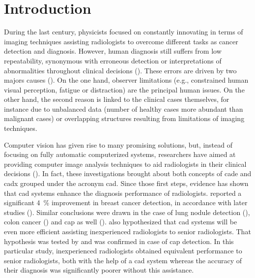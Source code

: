 \section{Introduction} \label{sec:introduction}

During the last century, physicists focused on constantly innovating in terms of imaging techniques assisting radiologists to overcome different tasks as cancer detection and diagnosis. However, human diagnosis still suffers from low repeatability, synonymous with erroneous detection or interpretations of abnormalities throughout clinical decisions (\cite{Giger2008,Hambrock2013}). These errors are driven by two majors causes (\cite{Giger2008}). On the one hand, observer limitations (e.g., constrained human visual perception, fatigue or distraction) are the principal human issues. On the other hand, the second reason is linked to the clinical cases themselves, for instance due to unbalanced data (number of healthy cases more abundant than malignant cases) or overlapping structures resulting from limitations of imaging techniques.

Computer vision has given rise to many promising solutions, but, instead of focusing on fully automatic computerized systems, researchers have aimed at providing computer image analysis techniques to aid radiologists in their clinical decisions (\cite{Giger2008}). In fact, these investigations brought about both concepts of \ac{cade} and \ac{cadx} grouped under the acronym \acs{cad}. Since those first steps, evidence has shown that \acs{cad} systems enhance the diagnosis performance of radiologists. \cite{Chan1999} reported a significant 4~\% improvement in breast cancer detection, in accordance with later studies (\cite{Dean2006}). Similar conclusions were drawn in the case of lung nodule detection (\cite{Li2004}), colon cancer (\cite{Petrick2008}) and \ac{cap} as well (\cite{Hambrock2013}). \cite{Chan1999} also hypothesized that \acs{cad} systems will be even more efficient assisting inexperienced radiologists to senior radiologists. That hypothesis was tested by \cite{Hambrock2013} and was confirmed in case of \ac{cap} detection. In this particular study, inexperienced radiologists obtained equivalent performance to senior radiologists, both with the help of a \acs{cad} system whereas the accuracy of their diagnosis was significantly poorer without this assistance.

